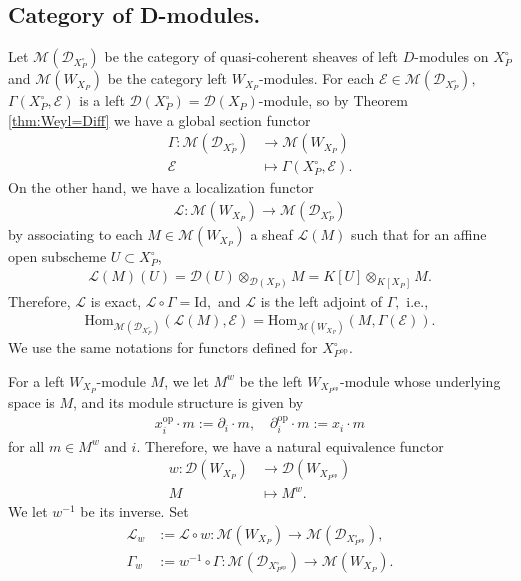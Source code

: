 \documentclass[11pt,a4paper,usenames,dvipsnames,reqno]{amsart}
\numberwithin{equation}{section}
\newcommand{\calM}{\mathcal{M}}
\theoremstyle{definition}
\theoremstyle{remark}
\begin{document}
\subsection{Category of D-modules.}
Let $\mathcal{M}(\mathcal{D}_{X_{P}^\circ})$ be the category of quasi-coherent sheaves of left $D$-modules on $X_{P}^\circ$ and $\mathcal{M}(W_{X_P})$ be the category left $W_{X_P}$-modules. For each $\mathcal{E}\in \calM(\mathcal{D}_{X_P^\circ}),$  $\Gamma(X_P^\circ,\mathcal{E})$ is a left $\mathcal{D}(X_P^\circ)=\mathcal{D}(X_P)$-module, so by Theorem \ref{thm:Weyl=Diff} we have a global section functor
\begin{align*}
    \Gamma: \calM(\mathcal{D}_{X_P^\circ}) &\longrightarrow \calM(W_{X_P})\\
     \mathcal{E} & \mapsto \Gamma(X_P^\circ, \mathcal{E}).
\end{align*}
On the other hand, we have a localization functor 
\begin{align*}
    \mathcal{L}: \calM(W_{X_P}) \longrightarrow \calM(\mathcal{D}_{X_P^\circ})      
\end{align*}
by associating to each $M\in \calM(W_{X_P})$ a sheaf $\mathcal{L}(M)$ such that for an affine open subscheme $U\subset X_P^\circ$, 
\begin{align*}
\mathcal{L}(M)(U)=\mathcal{D}(U)\otimes_{ \mathcal{D}(X_P)}M=K[U]\otimes_{K[X_P]} M.
\end{align*}
Therefore, $\mathcal{L}$ is exact, $\mathcal{L}\circ \Gamma=\mathrm{Id},$ and $\mathcal{L}$ is the left adjoint of $\Gamma,$ i.e.,
\begin{align*}
    \mathrm{Hom}_{\mathcal{M}(\mathcal{D}_{X_P^\circ})}(\mathcal{L}(M),\mathcal{E})=\mathrm{Hom}_{\mathcal{M}(W_{X_P})}(M,\Gamma(\mathcal{E})).
\end{align*}
We use the same notations for functors defined for $X_{P^{\mathrm{op}}}^\circ.$

For a left $W_{X_P}$-module $M$, we let $M^w$ be the left $W_{X_{P^{\mathrm{op}}}}$-module whose underlying space is $M$, and its module structure is given by
\begin{align*}
    x_i^{\mathrm{op}}\cdot m:=\partial_i\cdot m,\quad \partial_i^{\mathrm{op}}\cdot m:=x_i\cdot m
\end{align*}
for all $m\in M^w$ and $i$. Therefore, we have a natural equivalence functor
\begin{align*}
    w: \mathcal{D}(W_{X_P})&\longrightarrow \mathcal{D}(W_{X_{P^\mathrm{op}}})\\
    M&\longmapsto M^w.
\end{align*}
We let $w^{-1}$ be its inverse. Set
\begin{align*}
    \mathcal{L}_w&:=\mathcal{L}\circ w:\mathcal{M}(W_{X_P})\longrightarrow \mathcal{M}(\mathcal{D}_{X_{P^{\mathrm{op}}}^\circ}),\\
    \Gamma_w&:=w^{-1}\circ \Gamma:\mathcal{M}(\mathcal{D}_{X_{P^{\mathrm{op}}}^\circ})\longrightarrow \mathcal{M}(W_{X_P}).
\end{align*}
\end{document}
